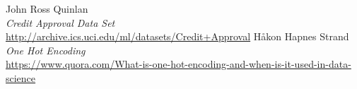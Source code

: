 \documentclass[a4paper,8pt]{article}
\begin{document}
\begin{thebibliography}{10}
	John Ross Quinlan \\
	\emph{Credit Approval Data Set} \\
	\url{http://archive.ics.uci.edu/ml/datasets/Credit+Approval}
	Håkon Hapnes Strand \\
	\emph{One Hot Encoding} \\
	\url{https://www.quora.com/What-is-one-hot-encoding-and-when-is-it-used-in-data-science}
	
\end{thebibliography}
\end{document}
